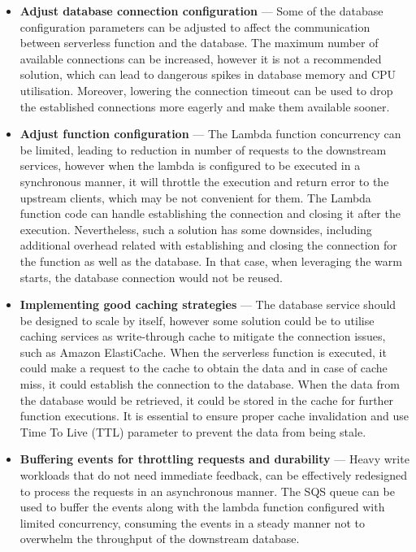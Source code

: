 \begin{itemize}
   \item \textbf{Adjust database connection configuration} ---
   Some of the database configuration parameters can be adjusted to affect the communication between serverless function and the database.
   The maximum number of available connections can be increased, however it is not a recommended solution, which can lead to dangerous spikes in database memory and CPU utilisation.
   Moreover, lowering the connection timeout can be used to drop the established connections more eagerly and make them available sooner.
   \item \textbf{Adjust function configuration} ---
   The Lambda function concurrency can be limited, leading to reduction in number of requests to the downstream services, however when the lambda is configured to be executed in a synchronous manner, it will throttle the execution and return error to the upstream clients, which may be not convenient for them.
   The Lambda function code can handle establishing the connection and closing it after the execution. Nevertheless, such a solution has some downsides, including additional overhead related with establishing and closing the connection for the function as well as the database.
   In that case, when leveraging the warm starts, the database connection would not be reused.
   \item \textbf{Implementing good caching strategies} ---
   The database service should be designed to scale by itself, however some solution could be to utilise caching services as write-through cache to mitigate the connection issues, such as Amazon ElastiCache.
   When the serverless function is executed, it could make a request to the cache to obtain the data and in case of cache miss, it could establish the connection to the database.
   When the data from the database would be retrieved, it could be stored in the cache for further function executions.
   It is essential to ensure proper cache invalidation and use Time To Live (TTL) parameter to prevent the data from being stale.
   \item \textbf{Buffering events for throttling requests and durability} ---
   Heavy write workloads that do not need immediate feedback, can be effectively redesigned to process the requests in an asynchronous manner.
   The SQS queue can be used to buffer the events along with the lambda function configured with limited concurrency, consuming the events in a steady manner not to overwhelm the throughput of the downstream database.

\end{itemize}
